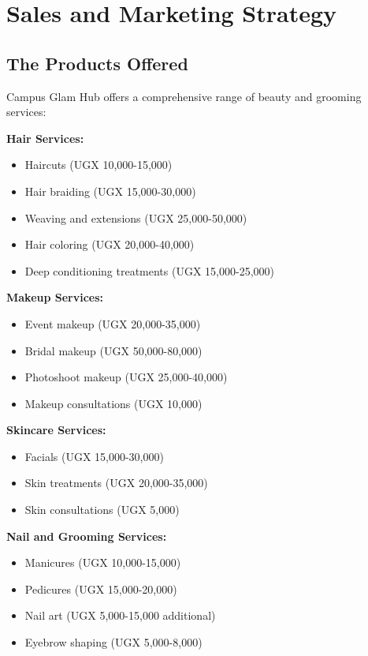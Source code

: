 \section{Sales and Marketing Strategy}

\subsection{The Products Offered}

Campus Glam Hub offers a comprehensive range of beauty and grooming services:

\textbf{Hair Services:}
\begin{itemize}[leftmargin=2em]
    \item Haircuts (UGX 10,000-15,000)
    \item Hair braiding (UGX 15,000-30,000)
    \item Weaving and extensions (UGX 25,000-50,000)
    \item Hair coloring (UGX 20,000-40,000)
    \item Deep conditioning treatments (UGX 15,000-25,000)
\end{itemize}

\textbf{Makeup Services:}
\begin{itemize}[leftmargin=2em]
    \item Event makeup (UGX 20,000-35,000)
    \item Bridal makeup (UGX 50,000-80,000)
    \item Photoshoot makeup (UGX 25,000-40,000)
    \item Makeup consultations (UGX 10,000)
\end{itemize}

\textbf{Skincare Services:}
\begin{itemize}[leftmargin=2em]
    \item Facials (UGX 15,000-30,000)
    \item Skin treatments (UGX 20,000-35,000)
    \item Skin consultations (UGX 5,000)
\end{itemize}

\textbf{Nail and Grooming Services:}
\begin{itemize}[leftmargin=2em]
    \item Manicures (UGX 10,000-15,000)
    \item Pedicures (UGX 15,000-20,000)
    \item Nail art (UGX 5,000-15,000 additional)
    \item Eyebrow shaping (UGX 5,000-8,000)
\end{itemize}

